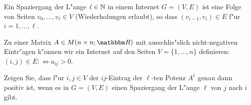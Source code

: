 \documentclass[a4,11pt]{article}
\begin{document}
\newpage

\begin{aufgabe}[4 Punkte]
Ein Spaziergang der L"ange $\ell \in \mathbb N$ in einem Internet $G=(V,E)$ ist
eine Folge von Seiten $v_0, \ldots, v_\ell \in V$ (Wiederholungen
erlaubt), so dass $(v_{i-1},v_i) \in E$ f"ur $i=1, \ldots, \ell$.

Zu einer Matrix $A \in M(n \times n; \R)$ mit ausschlie"slich nicht-negativen
Eintr"agen k"onnen wir ein Internet auf den Seiten $V = \{ 1, \ldots,
n \}$ definieren: $(i,j) \in E :\Leftrightarrow a_{ij} > 0$.

Zeigen Sie, dass f"ur $i,j \in V$ der $ij$-Eintrag der $\ell$-ten
Potenz $A^\ell$ genau dann positiv ist, wenn es in $G=(V,E)$ einen
Spaziergang der L"ange $\ell$ von $j$ nach $i$ gibt.
  
\end{aufgabe}
\end{document}
